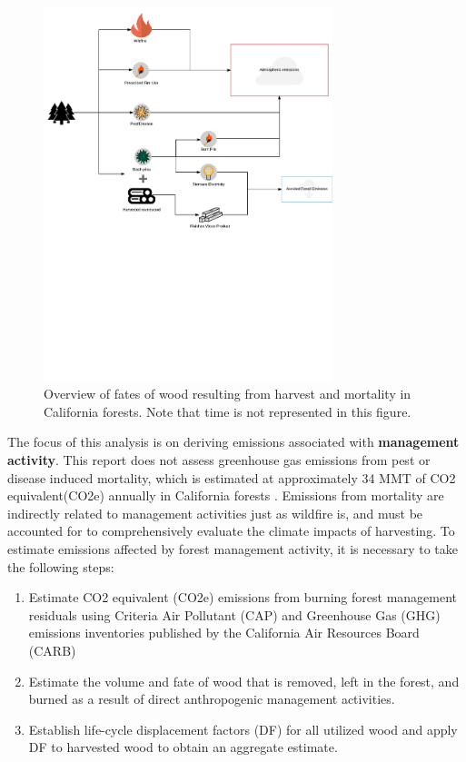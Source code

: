 \documentclass[a4paper]{article}
\begin{document}
\begin{figure}[htb]
\centering
\includegraphics[width=0.75\textwidth]{./graphics/wood_fates_rs.pdf}
\caption{Overview of fates of wood resulting from harvest and mortality in California forests. Note that time is not represented in this figure. \label{fig:wood_fates}}
\end{figure}


The focus of this analysis is on deriving emissions associated with \textbf{management activity}. This report does not assess greenhouse gas emissions from pest or disease induced mortality, which is estimated at approximately 34 MMT of CO2 equivalent(CO2e) annually in California forests \cite{Christensen2016}. Emissions from mortality are indirectly related to management activities just as wildfire is, and must be accounted for to comprehensively evaluate the climate impacts of harvesting. To estimate emissions affected by forest  management activity, it is necessary to take the following steps:

\begin{enumerate}
\item Estimate CO2 equivalent (CO2e) emissions from burning forest management
residuals using Criteria Air Pollutant (CAP) and Greenhouse Gas (GHG) emissions inventories
published by the California Air Resources Board (CARB)

\item Estimate the volume and fate of wood that is removed, left in the
forest, and burned as a result of direct anthropogenic management
activities.

\item Establish life-cycle displacement factors (DF) for all
utilized wood and apply DF to harvested wood to obtain an aggregate estimate.
\end{enumerate}
\end{document}
